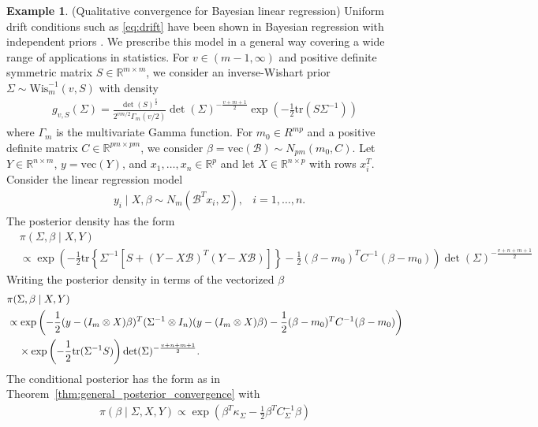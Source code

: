 \documentclass[ejsv2, noshowframe]{imsart}
\theoremstyle{plain}
\theoremstyle{definition}
\newtheorem*{example}{Example}
\theoremstyle{remark}
\newcommand{\tr}{\text{tr}}
\newcommand{\R}{\mathbb{R}}
\newcommand{\B}{\mathcal{B}}
\begin{document}
\begin{example}
(Qualitative convergence for Bayesian linear regression)
Uniform drift conditions such as \eqref{eq:drift} have been shown in Bayesian regression with independent priors \citep[Lemma 4.1]{Ekvall:Jones:2021}.
We prescribe this model in a general way covering a wide range of applications in statistics.
For $v \in (m-1, \infty)$ and positive definite symmetric matrix $S \in \R^{m \times m}$, we consider an inverse-Wishart prior $\Sigma \sim \text{Wis}_m^{-1}(v, S)$ with density 
\begin{align*}
g_{v, S}(\Sigma) = \frac{\det(S)^{\frac{v}{2}}}{2^{vm/2} \Gamma_m(v/2)} \det(\Sigma)^{-\frac{v + m + 1}{2}} \exp(-\frac{1}{2} \tr(S \Sigma^{-1}))
\end{align*}
where $\Gamma_m$ is the multivariate Gamma function.
For $m_0 \in R^{mp}$ and a positive definite matrix $C \in \R^{pm \times pm}$, we consider $\beta = \text{vec}(\B) \sim N_{pm}(m_0, C)$.
Let $Y \in \R^{n \times m}$, $y = \text{vec}(Y)$, and $x_1, \ldots, x_n \in \R^p$ and let $X \in \R^{n \times p}$ with rows $x_i^T$.
Consider the linear regression model
\begin{align*}
&y_i \mid X , \beta \sim N_m( \B^T x_i, \Sigma),
&i = 1, \ldots, n.
\end{align*}
The posterior density has the form
\begin{align*}
&\pi(\Sigma, \beta \mid X, Y)
\\
&\propto \exp\left( -\frac{1}{2} \tr\left\{ \Sigma^{-1} \left[ S + (Y - X \B)^T  (Y - X \B) \right] \right\} 
-\frac{1}{2} (\beta - m_0)^T C^{-1} (\beta - m_0) \right)
\det(\Sigma)^{-\frac{v + n + m + 1}{2}}
\end{align*}
Writing the posterior density in terms of the vectorized $\beta$
\begin{align*}
&\pi(\Sigma, \beta \mid X, Y)
\\
&\propto \exp\left( -\frac{1}{2} (y - (I_m \otimes X) \beta )^T (\Sigma^{-1} \otimes I_n) (y - (I_m \otimes X) \beta ) -\frac{1}{2} (\beta - m_0)^T C^{-1} (\beta - m_0) \right)
\\
&\hspace{.4cm} \times \exp\left( -\frac{1}{2} \tr( \Sigma^{-1} S ) \right) 
\det(\Sigma)^{-\frac{v + n + m + 1}{2}}.
\end{align*}
The conditional posterior has the form as in Theorem~\ref{thm:general_posterior_convergence} with
\begin{align*}
\pi(\beta \mid \Sigma, X, Y)
\propto \exp\left( \beta^T \kappa_{\Sigma}
-\frac{1}{2} \beta^T C_{\Sigma}^{-1} \beta \right)

\end{align*}
\end{example}
\end{document}
